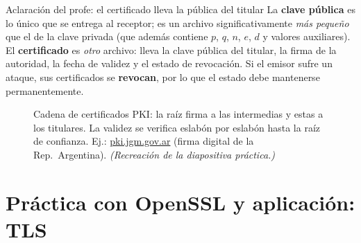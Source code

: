 \documentclass[11pt,a4paper]{article}
\begin{document}
\begin{defbox}{Aclaración del profe: el certificado lleva la pública del titular}
La \textbf{clave pública} es lo único que se entrega al receptor; es un archivo
significativamente \emph{más pequeño} que el de la clave privada (que además contiene $p$, $q$,
$n$, $e$, $d$ y valores auxiliares). El \textbf{certificado} es \emph{otro} archivo: lleva la
clave pública del titular, la firma de la autoridad, la fecha de validez y el estado de
revocación. Si el emisor sufre un ataque, sus certificados se \textbf{revocan}, por lo que el
estado debe mantenerse permanentemente.
\end{defbox}

\begin{figure}[h]
\centering
{}
\caption{Cadena de certificados PKI: la raíz firma a las intermedias y estas a los titulares.
La validez se verifica eslabón por eslabón hasta la raíz de confianza. Ej.:
\href{https://pki.jgm.gov.ar/}{pki.jgm.gov.ar} (firma digital de la Rep.\ Argentina).
\textit{(Recreación de la diapositiva práctica.)}}
\end{figure}

\section{Práctica con OpenSSL y aplicación: TLS}
\end{document}
